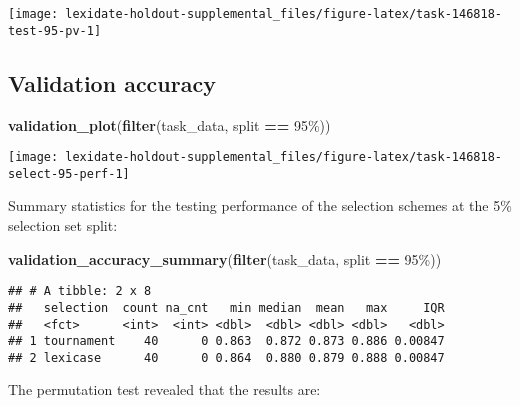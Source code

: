 \documentclass[
]{book}
\newenvironment{Shaded}{\begin{snugshade}}{\end{snugshade}}
\newcommand{\FunctionTok}[1]{\textcolor[rgb]{0.13,0.29,0.53}{\textbf{#1}}}
\newcommand{\NormalTok}[1]{#1}
\newcommand{\SpecialCharTok}[1]{\textcolor[rgb]{0.81,0.36,0.00}{\textbf{#1}}}
\newcommand{\StringTok}[1]{\textcolor[rgb]{0.31,0.60,0.02}{#1}}
\begin{document}
\texttt{[image: lexidate-holdout-supplemental\_files/figure-latex/task-146818-test-95-pv-1]}

\hypertarget{validation-accuracy-4}{%
\subsection{Validation accuracy}\label{validation-accuracy-4}}

\begin{Shaded}
\begin{Highlighting}[]
\FunctionTok{validation\_plot}\NormalTok{(}\FunctionTok{filter}\NormalTok{(task\_data, split }\SpecialCharTok{==} \StringTok{\textquotesingle{}95\%\textquotesingle{}}\NormalTok{))}
\end{Highlighting}
\end{Shaded}

\texttt{[image: lexidate-holdout-supplemental\_files/figure-latex/task-146818-select-95-perf-1]}

Summary statistics for the testing performance of the selection schemes at the 5\% selection set split:

\begin{Shaded}
\begin{Highlighting}[]
\FunctionTok{validation\_accuracy\_summary}\NormalTok{(}\FunctionTok{filter}\NormalTok{(task\_data, split }\SpecialCharTok{==} \StringTok{\textquotesingle{}95\%\textquotesingle{}}\NormalTok{))}
\end{Highlighting}
\end{Shaded}

\begin{verbatim}
## # A tibble: 2 x 8
##   selection  count na_cnt   min median  mean   max     IQR
##   <fct>      <int>  <int> <dbl>  <dbl> <dbl> <dbl>   <dbl>
## 1 tournament    40      0 0.863  0.872 0.873 0.886 0.00847
## 2 lexicase      40      0 0.864  0.880 0.879 0.888 0.00847
\end{verbatim}

The permutation test revealed that the results are:
\end{document}
